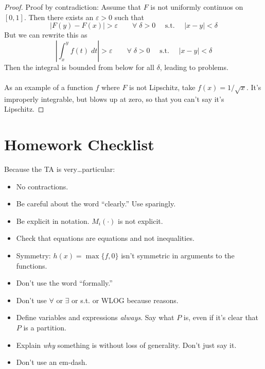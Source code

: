 \documentclass[12pt]{article}
\theoremstyle{plain}
\theoremstyle{definition}
\theoremstyle{remark}
\begin{document}
\begin{proof}
Proof by contradiction: Assume that $F$ is not uniformly continuos on $[0,1]$. Then there exists an $\varepsilon>0$ such that
\[
    |F(y) - F(x)| > \varepsilon \qquad
    \forall \; \delta >0 \quad \text{ s.t. } \quad 
    |x-y|< \delta
\]
But we can rewrite this as 
\[
    \left\lvert\int^y_x f(t)\;dt\right\rvert > \varepsilon \qquad
    \forall \; \delta >0 \quad \text{ s.t. } \quad 
    |x-y|< \delta
\]
Then the integral is bounded from below for all $\delta$, leading to problems.
\\
\\
As an example of a function $f$ where $F$ is not Lipschitz, take $f(x) = 1/\sqrt{x}$. It's improperly integrable, but blows up at zero, so that you can't say it's Lipschitz.
    
\end{proof}

\newpage
\section{Homework Checklist}

Because the TA is very\dots particular:
\begin{itemize}
    \item No contractions.
    \item Be careful about the word ``clearly.'' Use sparingly.
    \item Be explicit in notation. $M_i(\cdot)$ is not explicit.
    \item Check that equations are equations and not inequalities.
    \item Symmetry: $h(x) = \max\{f, 0\}$ isn't symmetric in arguments to the functions.
    \item Don't use the word ``formally.'' 
    \item Don't use $\forall$ or $\exists$ or s.t. or WLOG because reasons.
    \item Define variables and expressions \emph{always}. Say what $P$ is, even if it's clear that $P$ is a partition.
    \item Explain \emph{why} something is without loss of generality. Don't just say it.
    \item Don't use an em-dash.
\end{itemize}




% 
\end{document}
